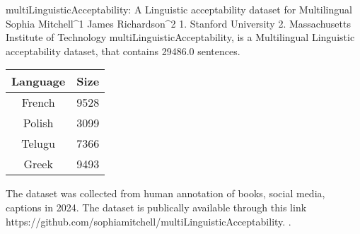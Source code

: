 
multiLinguisticAcceptability: A Linguistic acceptability dataset for Multilingual
Sophia Mitchell^1 James Richardson^2
1. Stanford University 2. Massachusetts Institute of Technology
multiLinguisticAcceptability, is a Multilingual Linguistic acceptability dataset, that contains 29486.0 sentences.

    \begin{table}[h]
    \centering
    \begin{tabular}{|c|c|}
    \hline
    Language & Size \\
    \hline
    French & 9528 \\ 
Polish & 3099 \\ 
Telugu & 7366 \\ 
Greek & 9493 \\ 
 \hline
    \end{tabular}
    \end{table}
    
The dataset was collected from human annotation of books, social media, captions in 2024. 
The dataset is publically available through this link https://github.com/sophiamitchell/multiLinguisticAcceptability. .

